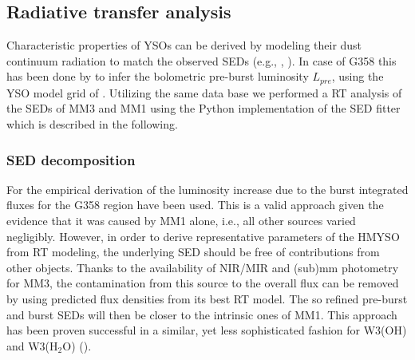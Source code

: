 \documentclass[longauth,usenatbib]{aa}
\begin{document}
\subsection{Radiative transfer analysis}\label{rta}
Characteristic properties of YSOs can be derived by modeling their dust continuum radiation to match the observed SEDs (e.g., , ). In case of G358 this has been done by  to infer the bolometric pre-burst luminosity
$L_{pre}$,
using the YSO model grid of . Utilizing the same data base we performed a RT analysis of the SEDs of MM3 and MM1 using the Python implementation of the SED fitter  which is described in the following.  


\subsubsection{SED decomposition}\label{sedc}
For the empirical derivation of the luminosity increase due to the burst integrated fluxes for the G358 region have been used. This is a valid approach given the evidence that it was caused by MM1 alone, i.e., all other sources varied negligibly. However, in order to derive representative parameters of the HMYSO from RT modeling, the underlying SED should be free of contributions from other objects. Thanks to the availability of NIR/MIR and (sub)mm photometry for MM3, the contamination from this source to the overall flux can be removed by using predicted flux densities from its best RT model. 
The so refined pre-burst and burst SEDs will then be closer to the intrinsic ones of MM1. This approach has been proven successful in a similar, yet less sophisticated fashion for W3(OH) and W3(H$_2$O) ().
\end{document}
